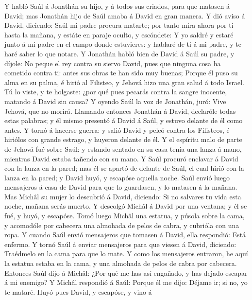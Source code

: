  Y habló Saúl á Jonathán su hijo, y á todos sus criados,
para que matasen á David; mas Jonathán hijo de Saúl amaba á David en
gran manera.  Y dió aviso á David, diciendo: Saúl mi padre
procura matarte; por tanto mira ahora por ti hasta la mañana, y estáte
en paraje oculto, y escóndete:  Y yo saldré y estaré junto
á mi padre en el campo donde estuvieres: y hablaré de ti á mi padre, y
te haré saber lo que notare.  Y Jonathán habló bien de
David á Saúl su padre, y díjole: No peque el rey contra su siervo David,
pues que ninguna cosa ha cometido contra ti: antes sus obras te han sido
muy buenas;  Porque él puso su alma en su palma, é hirió
al Filisteo, y Jehová hizo una gran salud á todo Israel. Tú lo viste, y
te holgaste: ¿por qué pues pecarás contra la sangre inocente, matando á
David sin causa?  Y oyendo Saúl la voz de Jonathán, juró:
Vive Jehová, que no morirá.  Llamando entonces Jonathán á
David, declaróle todas estas palabras; y él mismo presentó á David á
Saúl, y estuvo delante de él como antes.  Y tornó á
hacerse guerra: y salió David y peleó contra los Filisteos, é hiriólos
con grande estrago, y huyeron delante de él.  Y el
espíritu malo de parte de Jehová fué sobre Saúl: y estando sentado en su
casa tenía una lanza á mano, mientras David estaba tañendo con su mano.
 Y Saúl procuró enclavar á David con la lanza en la
pared; mas él se apartó de delante de Saúl, el cual hirió con la lanza
en la pared; y David huyó, y escapóse aquella noche. 
Saúl envió luego mensajeros á casa de David para que lo guardasen, y lo
matasen á la mañana. Mas Michâl su mujer lo descubrió á David, diciendo:
Si no salvares tu vida esta noche, mañana serás muerto. 
Y descolgó Michâl á David por una ventana; y él se fué, y huyó, y
escapóse.  Tomó luego Michâl una estatua, y púsola sobre
la cama, y acomodóle por cabecera una almohada de pelos de cabra, y
cubrióla con una ropa.  Y cuando Saúl envió mensajeros
que tomasen á David, ella respondió: Está enfermo.  Y
tornó Saúl á enviar mensajeros para que viesen á David, diciendo:
Traédmelo en la cama para que lo mate.  Y como los
mensajeros entraron, he aquí la estatua estaba en la cama, y una
almohada de pelos de cabra por cabecera.  Entonces Saúl
dijo á Michâl: ¿Por qué me has así engañado, y has dejado escapar á mi
enemigo? Y Michâl respondió á Saúl: Porque él me dijo: Déjame ir; si no,
yo te mataré.  Huyó pues David, y escapóse, y vino á
